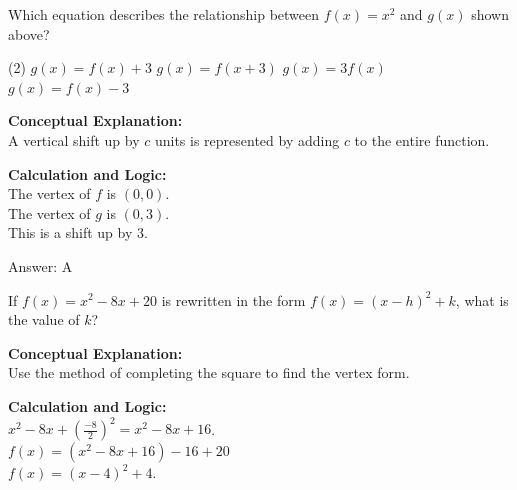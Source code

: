 \documentclass[11pt,paper=a4,answers]{exam}
\begin{document}
\begin{questions}
\question
\begin{center}
\end{center}
Which equation describes the relationship between $f(x) = x^2$ and $g(x)$ shown above?
\begin{tasks}(2)
    \task $g(x) = f(x) + 3$
    \task $g(x) = f(x+3)$
    \task $g(x) = 3f(x)$
    \task $g(x) = f(x) - 3$
\end{tasks}

\begin{solution}
\textbf{Conceptual Explanation:} \\
A vertical shift up by $c$ units is represented by adding $c$ to the entire function.

\vspace{20pt}

\textbf{Calculation and Logic:} \\
The vertex of $f$ is $(0, 0)$. \\
The vertex of $g$ is $(0, 3)$. \\
This is a shift up by 3.

\vspace{25pt}

Answer: \colorbox{yellow!100}{A}
\end{solution}

\vspace{40pt}

\question
If $f(x) = x^2 - 8x + 20$ is rewritten in the form $f(x) = (x-h)^2 + k$, what is the value of $k$?

\begin{solution}
\textbf{Conceptual Explanation:} \\
Use the method of completing the square to find the vertex form.

\vspace{20pt}

\textbf{Calculation and Logic:} \\
$x^2 - 8x + (\frac{-8}{2})^2 = x^2 - 8x + 16$. \\
$f(x) = (x^2 - 8x + 16) - 16 + 20$ \\
$f(x) = (x-4)^2 + 4$.


\end{solution}
\end{questions}
\end{document}
